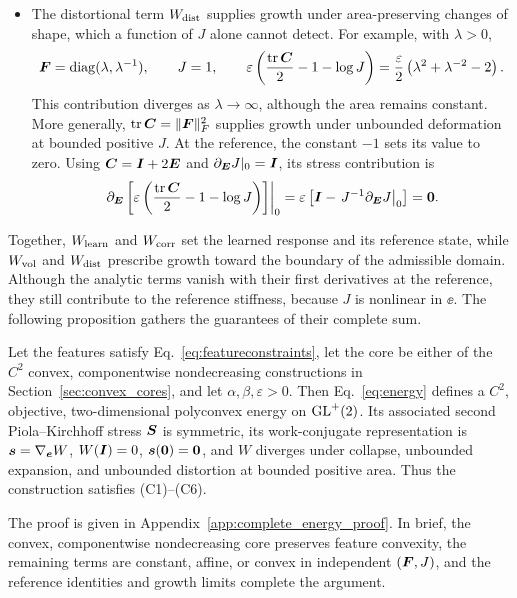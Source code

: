 \begin{itemize}
 \item[(iv)] The distortional term $W_{\rm dist}$ supplies growth under area-preserving changes of shape, which a function of $J$ alone cannot detect. For example, with $\lambda>0$,
 \begin{equation}
  \bm F=\operatorname{diag}(\lambda,\lambda^{-1}),\qquad
  J=1,\qquad
  \varepsilon\left(\frac{\operatorname{tr}\bm C}{2}-1-\log J\right)
  =\frac\varepsilon2\left(\lambda^2+\lambda^{-2}-2\right).
 \end{equation}
 This contribution diverges as $\lambda\to\infty$, although the area remains constant. More generally, $\operatorname{tr}\bm C=\|\bm F\|_F^2$ supplies growth under unbounded deformation at bounded positive $J$. At the reference, the constant $-1$ sets its value to zero. Using $\bm C=\bm I+2\bm E$ and $\partial_{\bm E}J|_0=\bm I$, its stress contribution is
 \begin{equation}
  \left.\partial_{\bm E}\left[\varepsilon\left(\frac{\operatorname{tr}\bm C}{2}-1-\log J\right)\right]\right|_0
  =\varepsilon\left[\bm I-\left.J^{-1}\partial_{\bm E}J\right|_0\right]
  =\bm0.
 \end{equation}
\end{itemize}
Together, $W_{\rm learn}$ and $W_{\rm corr}$ set the learned response and its reference state, while $W_{\rm vol}$ and $W_{\rm dist}$ prescribe growth toward the boundary of the admissible domain. Although the analytic terms vanish with their first derivatives at the reference, they still contribute to the reference stiffness, because $J$ is nonlinear in $\ee$. The following proposition gathers the guarantees of their complete sum.

\begin{proposition}
\label{prop:complete_energy}
Let the features satisfy Eq.~\eqref{eq:featureconstraints}, let the core be either of the $C^2$ convex, componentwise nondecreasing constructions in Section~\ref{sec:convex_cores}, and let $\alpha,\beta,\varepsilon>0$. Then Eq.~\eqref{eq:energy} defines a $C^2$, objective, two-dimensional polyconvex energy on $\mathrm{GL}^{+}(2)$. Its associated second Piola--Kirchhoff stress $\bm S$ is symmetric, its work-conjugate representation is $\bm s=\nabla_{\bm e}W$, $W(\bm I)=0$, $\bm s(\bm0)=\bm0$, and $W$ diverges under collapse, unbounded expansion, and unbounded distortion at bounded positive area. Thus the construction satisfies (C1)--(C6).
\end{proposition}
The proof is given in Appendix~\ref{app:complete_energy_proof}. In brief, the convex, componentwise nondecreasing core preserves feature convexity, the remaining terms are constant, affine, or convex in independent $(\bm F,J)$, and the reference identities and growth limits complete the argument.

